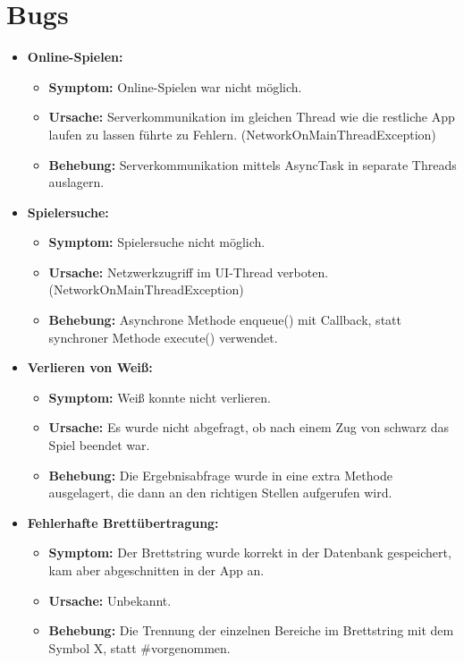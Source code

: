 \documentclass[parskip=full]{scrartcl}
\begin{document}
\section{Bugs}
\begin{itemize}
\item{\textbf{Online-Spielen:}}
	\begin{itemize}
	\item{\textbf{Symptom:}} Online-Spielen war nicht möglich.
	\item{\textbf{Ursache:}} Serverkommunikation im gleichen Thread wie die restliche App laufen zu 	lassen führte zu Fehlern. (NetworkOnMainThreadException)
	\item{\textbf{Behebung:}} Serverkommunikation mittels AsyncTask in separate Threads auslagern. 
	\end{itemize}

\item{\textbf{ Spielersuche:}} 
	\begin{itemize} 
	\item{\textbf{Symptom:}} Spielersuche nicht möglich.
	\item{\textbf{Ursache:}} Netzwerkzugriff im UI-Thread verboten. (NetworkOnMainThreadException)
	\item{\textbf{Behebung:}} Asynchrone Methode enqueue() mit Callback, statt synchroner Methode execute() verwendet. 
	\end{itemize}

\item{\textbf{Verlieren von Weiß:}}
	\begin{itemize}
	\item{\textbf{Symptom:}} Weiß konnte nicht verlieren.
	\item{\textbf{Ursache:}} Es wurde nicht abgefragt, ob nach einem Zug von schwarz das Spiel beendet war.
	\item{\textbf{Behebung:}} Die Ergebnisabfrage wurde in eine extra Methode ausgelagert, die dann an den richtigen Stellen aufgerufen wird.
	\end{itemize}

\item{\textbf{Fehlerhafte Brettübertragung:}}
	\begin{itemize}
		\item{\textbf{Symptom:}} Der Brettstring wurde korrekt in der Datenbank gespeichert, kam aber abgeschnitten in der App an.
		\item{\textbf{Ursache:}} Unbekannt.
		\item{\textbf{Behebung:}} Die Trennung der einzelnen Bereiche im Brettstring mit dem Symbol \glqq X\grqq, statt \glqq \#\grqq \space vorgenommen.
	\end{itemize}


\end{itemize}
\end{document}
